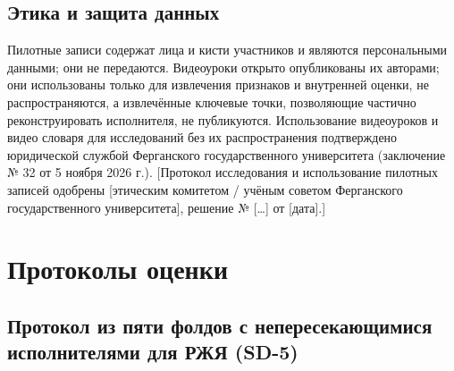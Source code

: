\documentclass[a4paper,fleqn]{cas-dc}
\begin{document}
\hypertarget{ux44dux442ux438ux43aux430-ux438-ux437ux430ux449ux438ux442ux430-ux434ux430ux43dux43dux44bux445}{%
\subsection{Этика и защита данных}\label{ux44dux442ux438ux43aux430-ux438-ux437ux430ux449ux438ux442ux430-ux434ux430ux43dux43dux44bux445}}

Пилотные записи содержат лица и кисти участников и являются персональными данными; они не передаются. Видеоуроки открыто опубликованы их авторами; они использованы только для извлечения признаков и внутренней оценки, не распространяются, а извлечённые ключевые точки, позволяющие частично реконструировать исполнителя, не публикуются. Использование видеоуроков и видео словаря для исследований без их распространения подтверждено юридической службой Ферганского государственного университета (заключение № 32 от 5 ноября 2026 г.). {\color{red}[Протокол исследования и использование пилотных записей одобрены {\color{red}[этическим комитетом / учёным советом Ферганского государственного университета]}, решение № {\color{red}[\ldots]} от {\color{red}[дата]}.]}

\hypertarget{ux43fux440ux43eux442ux43eux43aux43eux43bux44b-ux43eux446ux435ux43dux43aux438}{%
\section{Протоколы оценки}\label{ux43fux440ux43eux442ux43eux43aux43eux43bux44b-ux43eux446ux435ux43dux43aux438}}

\hypertarget{ux43fux440ux43eux442ux43eux43aux43eux43b-ux438ux437-ux43fux44fux442ux438-ux444ux43eux43bux434ux43eux432-ux441-ux43dux435ux43fux435ux440ux435ux441ux435ux43aux430ux44eux449ux438ux43cux438ux441ux44f-ux438ux441ux43fux43eux43bux43dux438ux442ux435ux43bux44fux43cux438-ux434ux43bux44f-ux440ux436ux44f-sd-5}{%
\subsection{Протокол из пяти фолдов с непересекающимися исполнителями для РЖЯ (SD-5)}\label{ux43fux440ux43eux442ux43eux43aux43eux43b-ux438ux437-ux43fux44fux442ux438-ux444ux43eux43bux434ux43eux432-ux441-ux43dux435ux43fux435ux440ux435ux441ux435ux43aux430ux44eux449ux438ux43cux438ux441ux44f-ux438ux441ux43fux43eux43bux43dux438ux442ux435ux43bux44fux43cux438-ux434ux43bux44f-ux440ux436ux44f-sd-5}}
\end{document}
